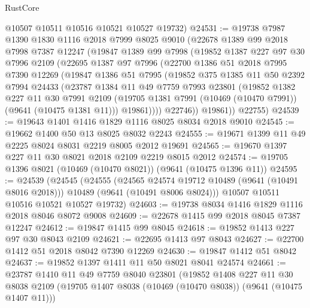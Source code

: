 \begin{lexlean}{RustCore}
\begin{coremodule}
      @10507
      @10511
      @10516
      @10521
      @10527
      @19732)
@24531 := @19738
    @7987
    @1390
    @1830
    @1116
    @2018
    @7999
    @8025
    @9010
    (@22678
      @1389
      @99
      @2018
      @7998
      @7387
      @12247
      (@19847
        @1389
        @99
        @7998
        (@19852
          @1387
          @227
          @97
          @30
          @7996
          @2109
          (@22695
            @1387
            @97
            @7996
            (@22700
              @1386
              @51
              @2018
              @7995
              @7390
              @12269
              (@19847
                @1386
                @51
                @7995
                (@19852
                  @375
                  @1385
                  @11
                  @50
                  @2392
                  @7994
                  @24433
                  (@23787
                    @1384
                    @11
                    @49
                    @7759
                    @7993
                    @23801
                    (@19852
                      @1382
                      @227
                      @11
                      @30
                      @7991
                      @2109
                      (@19705 @1381 @7991 (@10469 (@10470 @7991)) (@9641 (@10475 @1381 @11)))
                      @19861))))
              @22746))
          @19861))
      @22755)
@24539 := @19643 @1401 @1416 @1829 @1116 @8025 @8034 @2018 @9010
@24545 := @19662 @1400 @50 @13 @8025 @8032 @2243
@24555 := @19671 @1399 @11 @49 @2225 @8024 @8031 @2219 @8005 @2012 @19691
@24565 := @19670 @1397 @227 @11 @30 @8021 @2018 @2109 @2219 @8015 @2012
@24574 := @19705 @1396 @8021 (@10469 (@10470 @8021)) (@9641 (@10475 @1396 @11))
@24595 := @24539
    (@24545
      (@24555
        (@24565 @24574 @19712 @10489 (@9641 (@10491 @8016 @2018)))
        @10489
        (@9641 (@10491 @8006 @8024)))
      @10507
      @10511
      @10516
      @10521
      @10527
      @19732)
@24603 := @19738 @8034 @1416 @1829 @1116 @2018 @8046 @8072 @9008
@24609 := @22678 @1415 @99 @2018 @8045 @7387 @12247
@24612 := @19847 @1415 @99 @8045
@24618 := @19852 @1413 @227 @97 @30 @8043 @2109
@24621 := @22695 @1413 @97 @8043
@24627 := @22700 @1412 @51 @2018 @8042 @7390 @12269
@24630 := @19847 @1412 @51 @8042
@24637 := @19852 @1397 @1411 @11 @50 @8021 @8041 @24574
@24661 := @23787
    @1410
    @11
    @49
    @7759
    @8040
    @23801
    (@19852
      @1408
      @227
      @11
      @30
      @8038
      @2109
      (@19705 @1407 @8038 (@10469 (@10470 @8038)) (@9641 (@10475 @1407 @11)))

\end{coremodule}
\end{lexlean}
